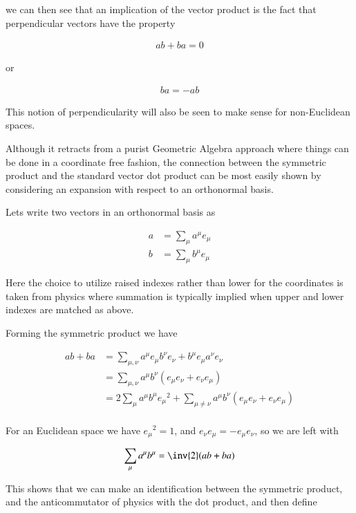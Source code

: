 \documentclass{article}
\begin{document}
we can then see that an implication of the vector product is the fact that perpendicular vectors have the property

\begin{align*}
a b + ba = 0
\end{align*}

or

\begin{align*}
b a = - a b
\end{align*}

This notion of perpendicularity will also be seen to make sense for non-Euclidean spaces.

Although it retracts from a purist Geometric Algebra approach where things can be done in a coordinate free fashion, the connection between the symmetric product and the standard vector dot product can be most easily shown by considering an expansion with respect to an orthonormal basis.

Lets write two vectors in an orthonormal basis as

\begin{align*}
a &= \sum_\mu a^\mu e_\mu \\
b &= \sum_\mu b^\mu e_\mu
\end{align*}

Here the choice to utilize raised indexes rather than lower for the coordinates is taken from physics where summation is typically implied when upper and lower indexes are matched as above.

Forming the symmetric product we have

\begin{align*}
a b + b a
&=
\sum_{\mu,\nu} a^\mu e_\mu b^\nu e_\nu + b^\mu e_\mu a^\nu e_\nu \\
&=
\sum_{\mu,\nu} a^\mu b^\nu \left( e_\mu e_\nu + e_\nu e_\mu \right) \\
&=
2 \sum_{\mu} a^\mu b^\mu {e_\mu}^2 + \sum_{\mu \ne \nu} a^\mu b^\nu \left( e_\mu e_\nu + e_\nu e_\mu \right) \\
\end{align*}

For an Euclidean space we have ${e_\mu}^2 = 1$, and $e_\nu e_\mu = -e_\mu e_\nu$, so we are left with

\begin{align*}
\sum_{\mu} a^\mu b^\mu = \inv{2} ( a b + b a)
\end{align*}

This shows that we can make an identification between the symmetric product, and the anticommutator of physics with the dot product, and then define
\end{document}

